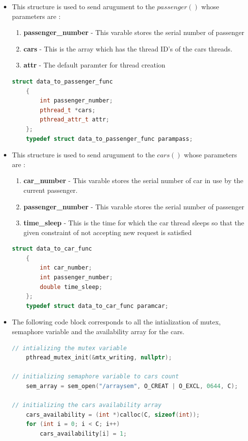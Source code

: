 \documentclass[12pt,a4paper]{article}
\begin{document}
\begin{itemize}
	\item This structure is used to send arugument to the $passenger()$ whose parameters are :
\begin{enumerate}
	\item \textbf{passenger\_number} - This varable stores the serial number of passenger 
	\item  \textbf{cars} - This is the array which has the thread ID's of the cars threads.
	\item \textbf{attr} - The default paramter for thread creation
\end{enumerate}
	\begin{lstlisting}[language=C++, style = mystyle]
	struct data_to_passenger_func
	{
		int passenger_number; 
		pthread_t *cars;   
		pthread_attr_t attr;
	};
	typedef struct data_to_passenger_func parampass;
\end{lstlisting}
	\item This structure is used to send arugument to the $cars()$ whose parameters are :
\begin{enumerate}
	\item \textbf{car\_number} - This varable stores the serial number of car in use by the current passenger.
	\item  \textbf{passenger\_number} - This varable stores the serial number of passenger 
	\item \textbf{time\_sleep} - This is the time for which the car thread sleeps so that the given constraint of not accepting new request is satisfied
\end{enumerate}
	\begin{lstlisting}[language=C++, style = mystyle]
	struct data_to_car_func
	{
		int car_number;      
		int passenger_number; 
		double time_sleep;   
	};
	typedef struct data_to_car_func paramcar;
\end{lstlisting}

	\item The following code block corresponds to all the intialization of mutex, semaphore variable and the availability array for the cars.
	\begin{lstlisting}[language=C++, style = mystyle]
// intializing the mutex variable
	pthread_mutex_init(&mtx_writing, nullptr);

// initializing semaphore variable to cars count
	sem_array = sem_open("/arraysem", O_CREAT | O_EXCL, 0644, C);

// initializing the cars availability array
	cars_availability = (int *)calloc(C, sizeof(int));
	for (int i = 0; i < C; i++)
		cars_availability[i] = 1;
\end{lstlisting}


\end{itemize}
\end{document}
